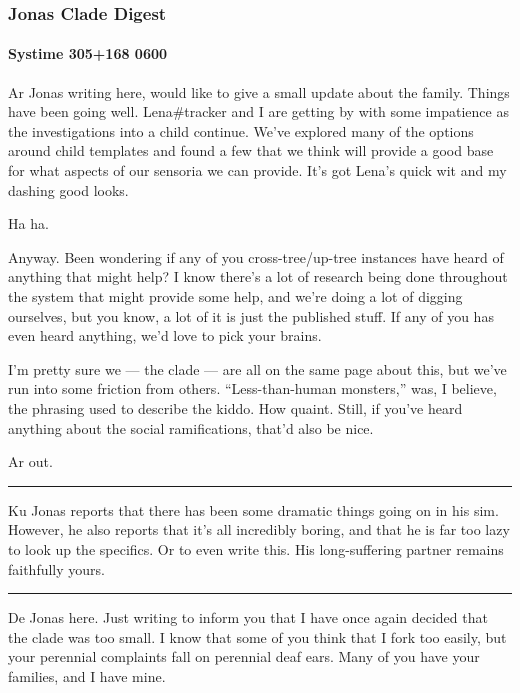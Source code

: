 \hypertarget{jonas-clade-digest}{%
\subsubsection{Jonas Clade Digest}\label{jonas-clade-digest}}

\hypertarget{systime-305168-0600}{%
\paragraph{Systime 305+168 0600}\label{systime-305168-0600}}

Ar Jonas writing here, would like to give a small update about the family. Things have been going well. Lena\#tracker and I are getting by with some impatience as the investigations into a child continue. We've explored many of the options around child templates and found a few that we think will provide a good base for what aspects of our sensoria we can provide. It's got Lena's quick wit and my dashing good looks.

Ha ha.

Anyway. Been wondering if any of you cross-tree/up-tree instances have heard of anything that might help? I know there's a lot of research being done throughout the system that might provide some help, and we're doing a lot of digging ourselves, but you know, a lot of it is just the published stuff. If any of you has even heard anything, we'd love to pick your brains.

I'm pretty sure we --- the clade --- are all on the same page about this, but we've run into some friction from others. ``Less-than-human monsters,'' was, I believe, the phrasing used to describe the kiddo. How quaint. Still, if you've heard anything about the social ramifications, that'd also be nice.

Ar out.

\begin{center}\rule{0.5\linewidth}{\linethickness}\end{center}

Ku Jonas reports that there has been some dramatic things going on in his sim. However, he also reports that it's all incredibly boring, and that he is far too lazy to look up the specifics. Or to even write this. His long-suffering partner remains faithfully yours.

\begin{center}\rule{0.5\linewidth}{\linethickness}\end{center}

De Jonas here. Just writing to inform you that I have once again decided that the clade was too small. I know that some of you think that I fork too easily, but your perennial complaints fall on perennial deaf ears. Many of you have your families, and I have mine.

